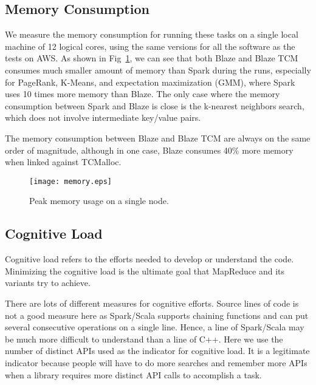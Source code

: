 \subsection{Memory Consumption}

We measure the memory consumption for running these tasks on a single local machine of 12 logical cores, using the same versions for all the software as the tests on AWS.
As shown in Fig~\ref{fig:mem}, we can see that both Blaze and Blaze TCM consumes much smaller amount of memory than Spark during the runs, especially for PageRank, K-Means, and expectation maximization (GMM), where Spark uses 10 times more memory than Blaze.
The only case where the memory consumption between Spark and Blaze is close is the k-nearest neighbors search, which does not involve intermediate key/value pairs.

The memory consumption between Blaze and Blaze TCM are always on the same order of magnitude, although in one case, Blaze consumes 40\% more memory when linked against TCMalloc.

\begin{figure}
  \begin{center}
  \texttt{[image: memory.eps]}
  \end{center}
  \vspace{-0.5cm}
  \caption{Peak memory usage on a single node.
  }
  \label{fig:mem}
\end{figure}

\subsection{Cognitive Load}

Cognitive load refers to the efforts needed to develop or understand the code.
Minimizing the cognitive load is the ultimate goal that MapReduce and its variants try to achieve.

There are lots of different measures for cognitive efforts.
Source lines of code is not a good measure here as Spark/Scala supports chaining functions and can put several consecutive operations on a single line.
Hence, a line of Spark/Scala may be much more difficult to understand than a line of C++.
Here we use the number of distinct APIs used as the indicator for cognitive load.
It is a legitimate indicator because people will have to do more searches and remember more APIs when a library requires more distinct API calls to accomplish a task.

